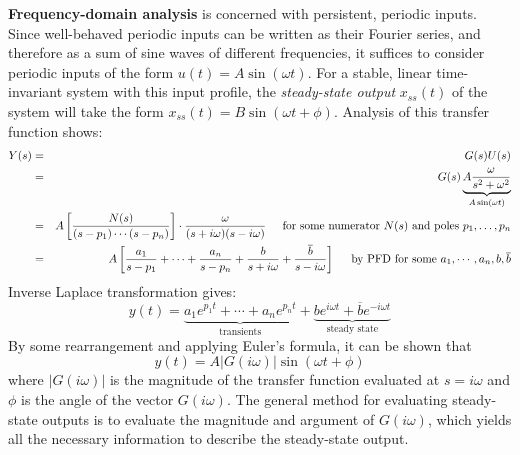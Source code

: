 \newpage
\textbf{Frequency-domain analysis} is concerned with persistent, periodic inputs. Since well-behaved periodic inputs can be written as their Fourier series, and therefore as a sum of sine waves of different frequencies, it suffices to consider periodic inputs of the form $u(t) = A\sin(\omega t)$. For a stable, linear time-invariant system with this input profile, the \textit{steady-state output} $x_{ss}(t)$ of the system will take the form $x_{ss}(t) = B\sin(\omega t + \phi)$. Analysis of this transfer function shows: \begin{eqnarray*}
    Y(s) &=& G(s)U(s)\\
    &=& G(s) \underbrace{A\frac{\omega}{s^2+\omega^2}}_{A\sin(\omega t)}\\
    &=& A\left[\frac{N(s)}{(s-p_1)\cdots (s-p_n)}\right] \cdot \frac{\omega}{(s+i\omega)(s-i\omega)} \hspace{0.2in}\text{for some numerator }N(s)\text{ and poles }p_1,\dots,p_n\\
    &=& A \left[\frac{a_1}{s-p_1} + \cdots + \frac{a_n}{s-p_n} + \frac{b}{s+i\omega} + \frac{\overline{b}}{s-i\omega}\right] \hspace{0.2in} \text{by PFD for some }a_1,\cdots,a_n,b,\overline{b}\\
\end{eqnarray*} Inverse Laplace transformation gives: \[y(t) = \underbrace{a_1 e^{p_1 t}+ \cdots + a_ne^{p_nt}}_\text{transients} + \underbrace{be^{i\omega t} + \overline{b} e^{-i\omega t}}_\text{steady state}\] By some rearrangement and applying Euler's formula, it can be shown that \[y(t) = A|G(i\omega)|\sin(\omega t + \phi)\] where $|G(i\omega)|$ is the magnitude of the transfer function evaluated at $s=i\omega$ and $\phi$ is the angle of the vector $G(i\omega)$. The general method for evaluating steady-state outputs is to evaluate the magnitude and argument of $G(i\omega)$, which yields all the necessary information to describe the steady-state output.



